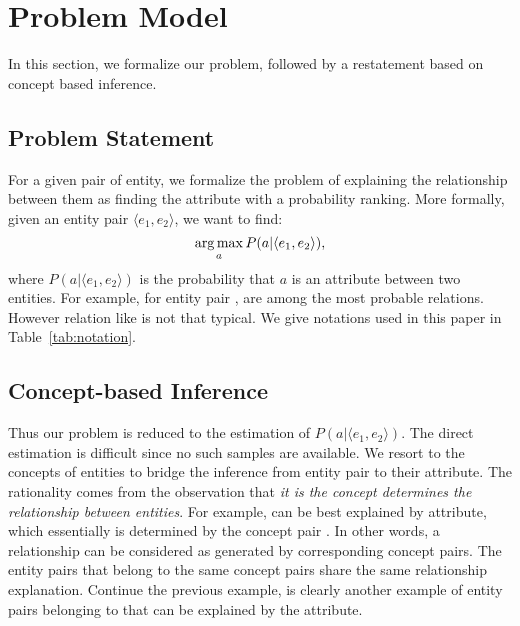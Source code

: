 
\section{Problem Model}
\label{sec:framework}

In this section, we formalize our problem, followed by a restatement based on concept based inference.

\subsection{Problem Statement}
For a given pair of entity, we formalize the problem of explaining the relationship between them as finding the attribute with a probability ranking.
More formally, given an entity pair $ \langle e_1, e_2 \rangle $, we want to find:
\begin{equation}
\operatorname*{arg\,max}_a P(a|\langle e_1,e_2 \rangle),
\end{equation}
where $P(a| \langle e_1, e_2 \rangle )$ is the probability that $a$ is an attribute between two entities.
For example, for entity pair ,  are among the most probable relations.
However relation like  is not that typical. We give notations used in this paper in Table~\ref{tab:notation}.

\subsection{Concept-based Inference}
Thus our problem is reduced to the estimation of $P(a| \langle e_1, e_2 \rangle )$.
The direct estimation is difficult since no such samples are available.
We resort to the concepts of entities to bridge the inference from entity pair to their attribute.
The rationality comes from the observation that {\it it is the concept determines the relationship between entities}. For example,  can be best explained by  attribute, which essentially is determined by the concept pair .
In other words, a relationship can be considered as generated by corresponding concept pairs.
The entity pairs that belong to the same concept pairs share the same relationship explanation.
Continue the previous example,  is clearly another example of entity pairs belonging to  that can be explained by the  attribute.

